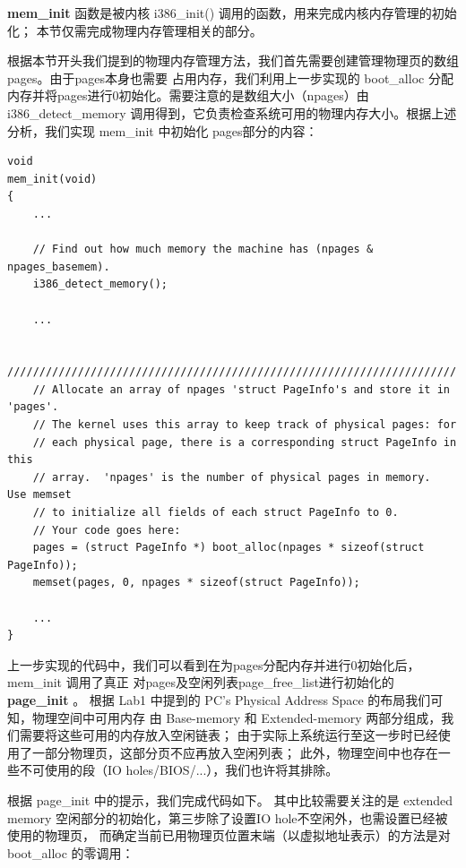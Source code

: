 \documentclass[12pt, letterpaper]{report}
\begin{document}
\textbf{mem\_init} 函数是被内核 i386\_init() 调用的函数，用来完成内核内存管理的初始化；
本节仅需完成物理内存管理相关的部分。\par 
根据本节开头我们提到的物理内存管理方法，我们首先需要创建管理物理页的数组pages。由于pages本身也需要
占用内存，我们利用上一步实现的 boot\_alloc 分配内存并将pages进行0初始化。需要注意的是数组大小（npages）由 
i386\_detect\_memory 调用得到，它负责检查系统可用的物理内存大小。根据上述分析，我们实现 mem\_init 中初始化
pages部分的内容：\par 

\lstset{style=CStyle}
\setmainfont{Consolas}
\begin{lstlisting}
void
mem_init(void)
{
    ...

    // Find out how much memory the machine has (npages & npages_basemem).
    i386_detect_memory();

    ...

    //////////////////////////////////////////////////////////////////////
    // Allocate an array of npages 'struct PageInfo's and store it in 'pages'.
    // The kernel uses this array to keep track of physical pages: for
    // each physical page, there is a corresponding struct PageInfo in this
    // array.  'npages' is the number of physical pages in memory.  Use memset
    // to initialize all fields of each struct PageInfo to 0.
    // Your code goes here:
    pages = (struct PageInfo *) boot_alloc(npages * sizeof(struct PageInfo));
    memset(pages, 0, npages * sizeof(struct PageInfo));

    ...
}
\end{lstlisting}
\setmainfont{Times New Roman}
\quad \par

上一步实现的代码中，我们可以看到在为pages分配内存并进行0初始化后，mem\_init 调用了真正
对pages及空闲列表page\_free\_list进行初始化的 \textbf{page\_init} 。
根据 Lab1 中提到的 PC's Physical Address Space 的布局我们可知，物理空间中可用内存
由 Base-memory 和 Extended-memory 两部分组成，我们需要将这些可用的内存放入空闲链表；
由于实际上系统运行至这一步时已经使用了一部分物理页，这部分页不应再放入空闲列表；
此外，物理空间中也存在一些不可使用的段（IO holes/BIOS/...），我们也许将其排除。\par
根据 page\_init 中的提示，我们完成代码如下。
其中比较需要关注的是 extended memory 空闲部分的初始化，第三步除了设置IO hole不空闲外，也需设置已经被使用的物理页，
而确定当前已用物理页位置末端（以虚拟地址表示）的方法是对 boot\_alloc 的零调用：\par 
\end{document}
